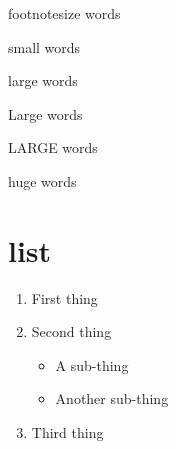 \documentclass[a4paper,12pt]{article}
\begin{document}
		{\footnotesize footnotesize words}
		
		{\small small words}
		
		{\large large words}
		
		{\Large Large words}
		
		{\LARGE LARGE words}
		
		{\huge huge words}
	\section{list}
			\begin{enumerate}
			\item First thing
			\item Second thing
			\begin{itemize}
			\item A sub-thing
			\item Another sub-thing
			\end{itemize}
			\item Third thing
			\end{enumerate}
\end{document}
